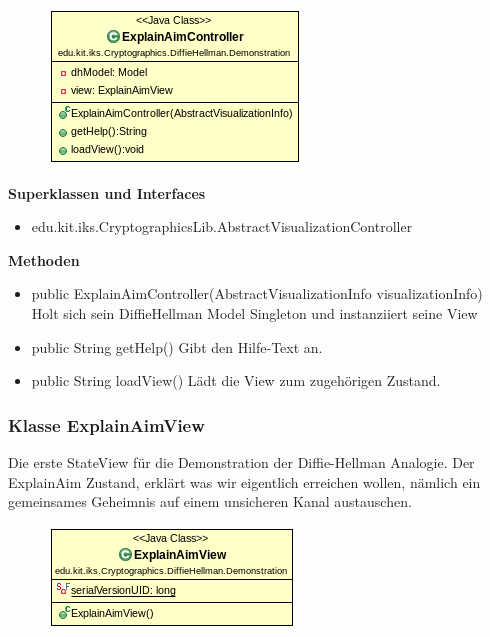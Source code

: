 \documentclass{article}
\begin{document}
      \begin{figure}[H]
        \centering
        \includegraphics{resources/edu-kit-iks-Cryptographics-DiffieHellman-Demonstration-ExplainAimController}
      \end{figure}

      \textbf{Superklassen und Interfaces}
      \begin{itemize}
        \item edu.kit.iks.CryptographicsLib.AbstractVisualizationController
      \end{itemize}

      \textbf{Methoden}
      \begin{itemize}
          \item public ExplainAimController(AbstractVisualizationInfo visualizationInfo) \newline
              Holt sich sein DiffieHellman Model Singleton und instanziiert seine View
        \item public String getHelp() \newline
        Gibt den Hilfe-Text an.
        \item public String loadView() \newline
        Lädt die View zum zugehörigen Zustand.
      \end{itemize}

\subsubsection{Klasse ExplainAimView}
      Die erste StateView für die Demonstration der Diffie-Hellman Analogie.
      Der ExplainAim Zustand, erklärt was wir eigentlich erreichen wollen,
      nämlich ein gemeinsames Geheimnis auf einem unsicheren Kanal austauschen.

      \begin{figure}[H]
        \centering
        \includegraphics{resources/edu-kit-iks-Cryptographics-DiffieHellman-Demonstration-ExplainAimView}
      \end{figure}
\end{document}
